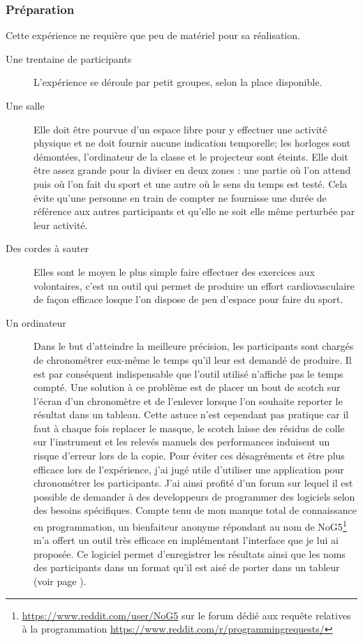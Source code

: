 \documentclass[12pt,fleqn,oneside,openany]{book} %
\begin{document}
\subsubsection{Préparation} \label{sssec:preparation2.1}
Cette expérience ne requière que peu de matériel pour sa réalisation.

\begin{description}
	\item[Une trentaine de participants] L'expérience se déroule par petit groupes, selon la place disponible.
	\item[Une salle] Elle doit être pourvue d'un espace libre pour y effectuer une activité physique et ne doit fournir aucune indication temporelle; les horloges sont démontées, l'ordinateur de la classe et le projecteur sont éteints. Elle doit être assez grande pour la diviser en deux zones : une partie où l'on attend puis où l'on fait du sport et une autre où le sens du temps est testé. Cela évite qu'une personne en train de compter ne fournisse une durée de référence aux autres participants et qu'elle ne soit elle même perturbée par leur activité. 
	\item[Des cordes à sauter] Elles sont le moyen le plus simple faire effectuer des exercices aux volontaires, c'est un outil qui permet de produire un effort cardiovasculaire de façon efficace losque l'on dispose de peu d'espace pour faire du sport.
	\item[Un ordinateur] Dans le but d'atteindre la meilleure précision, les participants sont chargés de chronométrer eux-même le temps qu'il leur est demandé de produire. Il est par conséquent indispensable que l'outil utilisé n'affiche pas le temps compté. Une solution à ce problème est de placer un bout de scotch sur l'écran d'un chronomètre et de l'enlever lorsque l'on souhaite reporter le résultat dans un tableau. Cette astuce n'est cependant pas pratique car il faut à chaque fois replacer le masque, le scotch laisse des résidus de colle sur l'instrument et les relevés manuels des performances induisent un risque d'erreur lors de la copie. Pour éviter ces désagréments et être plus efficace lors de l'expérience, j'ai jugé utile d'utiliser une application pour chronométrer les participants. J'ai ainsi profité d'un forum sur lequel il est possible de demander à des developpeurs de programmer des logiciels selon des besoins spécifiques. Compte tenu de mon manque total de connaissance en programmation, un bienfaiteur anonyme répondant au nom de NoG5\footnote{\url{https://www.reddit.com/user/NoG5} sur le forum dédié aux requête relatives à la programmation \url{https://www.reddit.com/r/programmingrequests/}} m'a offert un outil très efficace en implémentant l'interface que je lui ai proposée. Ce logiciel permet d'enregistrer les résultats ainsi que les noms des participants dans un format qu'il est aisé de porter dans un tableur (voir page \pageref{sec:chrono}).
\end{description}
\end{document}

